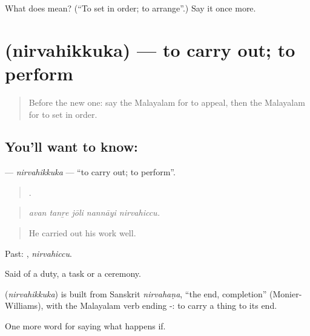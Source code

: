 \begin{tcolorbox}[breakable,colback=teal!4,colframe=teal!35!black,title={Before you move on}]
What does  mean? (\textquotedblleft{}To set in order; to arrange\textquotedblright{}.) Say it once more.
\end{tcolorbox}
\section[\texorpdfstring{\ml{നിർവഹിക്കുക} (nirvahikkuka)}{നിർവഹിക്കുക (nirvahikkuka)}]{ (nirvahikkuka) — to carry out; to perform}

\label{lesson:ML-C457-nirvahikkuka}



\begin{quote}
Before the new one: say the Malayalam for to appeal, then the Malayalam for to set in order.
\end{quote}

\subsection*{You'll want to know: }
\textbf{} — \emph{nirvahikkuka} — \textquotedblleft{}to carry out; to perform\textquotedblright{}.

\begin{quote}
    .
\end{quote}

\begin{quote}
\emph{avan tanṟe jōli nannāyi nirvahiccu.}
\end{quote}

\begin{quote}
He carried out his work well.
\end{quote}

Past: , \emph{nirvahiccu}.

Said of a duty, a task or a ceremony.

\begin{cousinweb}
\textbf{} (\emph{nirvahikkuka}) is built from Sanskrit \emph{nirvahaṇa}, \textquotedblleft{}the end, completion\textquotedblright{} (Monier-Williams), with the Malayalam verb ending -: to carry a thing to its end.
\end{cousinweb}

\begin{grammarlens}[title={What you've built}]
One more word for saying what happens if.
\end{grammarlens}

